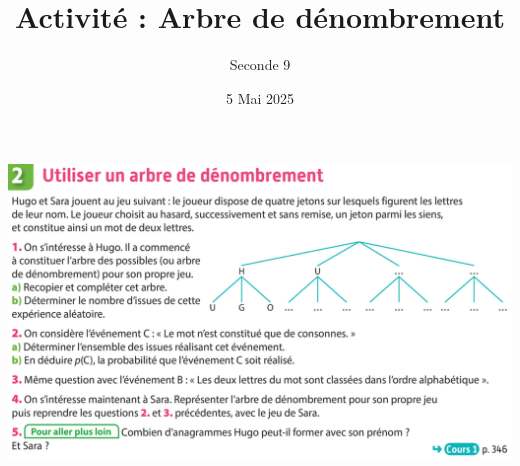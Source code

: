 \documentclass{article}
\title{Activité : Arbre de dénombrement}
\date{5 Mai 2025}
\author{Seconde 9}
\begin{document}
\maketitle
\begin{center}
\includegraphics[width=\textwidth]{Activite_denombrement_arbre.png}
\end{center}
\end{document}
